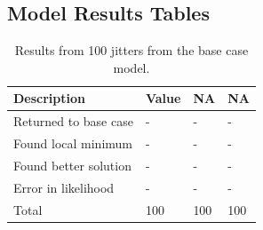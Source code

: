\documentclass[12pt,]{article}
\begin{document}
\FloatBarrier
\newpage

\newpage
\FloatBarrier

\FloatBarrier

\FloatBarrier

\FloatBarrier

\newpage

\hypertarget{model-results-tables}{%
\subsection{Model Results Tables}\label{model-results-tables}}

\FloatBarrier

\begin{table}[ht]
\centering
\caption{Results from 100 jitters from the base 
                                      case model.} 
\label{tab:jitter}
\begin{tabular}{llll}
  \hline
Description & Value & NA & NA \\ 
  \hline
Returned to base case & - & - & - \\ 
  Found local minimum & - & - & - \\ 
  Found better solution & - & - & - \\ 
  Error in likelihood & - & - & - \\ 
  Total & 100 & 100 & 100 \\ 
   \hline
\end{tabular}
\end{table}
\end{document}
